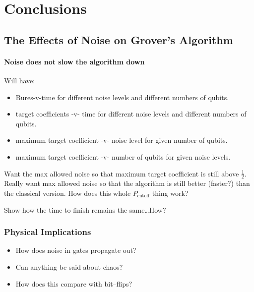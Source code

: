 
\chapter{Conclusions}
\label{chap:conclusion}
%

\section{The Effects of Noise on Grover's Algorithm}

\subsubsection{Noise does not slow the algorithm down}

Will have:
\begin{itemize}
\item Bures-v-time for different noise levels and different numbers of qubits.
\item target coefficients -v- time for different noise levels and different numbers
of qubits.
\item maximum target coefficient -v- noise level for given number of qubits.
\item maximum target coefficient -v- number of qubits for given noise levels.
\end{itemize}
Want the max allowed noise so that maximum target coefficient is still above 
$\frac{1}{2}$.  Really want max allowed noise so that the algorithm is still
better (faster?) than the classical version.  How does this whole
$P_{\text{cutoff}}$ thing work?\cite{Pablo-Norman/Ruiz-Altaba:99}

Show how the time to finish remains the same\dots How?


\subsection{Physical Implications}

\begin{itemize}
\item How does noise in gates propagate out?
\item Can anything be said about chaos?
\item How does this compare with bit--flips?
\end{itemize}




